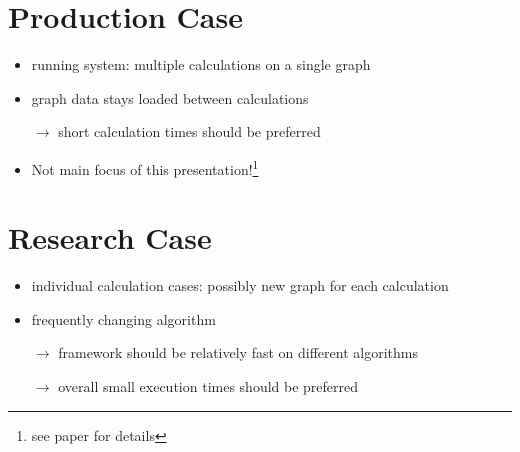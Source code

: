 \documentclass{meetings}
\begin{document}
\begin{multicols}{2}
\section{Production Case}
\vspace{1cm}
\begin{itemize}
	\item running system: multiple calculations on a single graph
	\item graph data stays loaded between calculations
	\item[$\rightarrow$] short calculation times should be preferred
	\item Not main focus of this presentation!\footnote{\sffamily see paper for details}
\end{itemize}

\columnbreak
\section{Research Case}
\vspace{1cm}
\begin{itemize}
	\item individual calculation cases: possibly new graph for each calculation
	\item frequently changing algorithm
	\item[$\rightarrow$] framework should be relatively fast on different algorithms
	\item[$\rightarrow$] overall small execution times should be preferred
\end{itemize}
\end{multicols}


\end{document}
